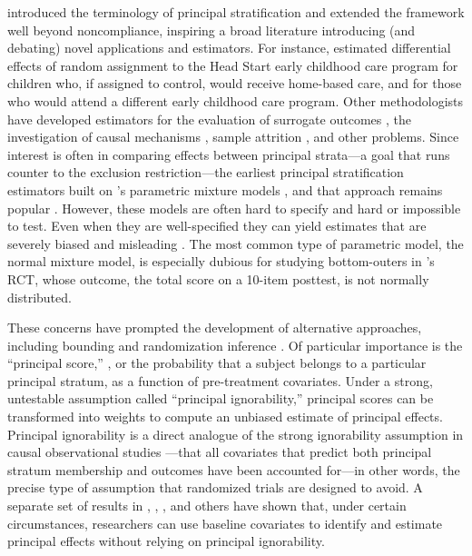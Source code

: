\documentclass[]{article}
\begin{document}
\citet{frangakis} introduced the terminology of principal stratification and extended the framework well beyond noncompliance, inspiring a broad literature introducing (and debating) novel applications and estimators.
For instance, \citet{fellerEtAl2016} estimated differential effects of random assignment to the Head Start early childhood care program for children who, if assigned to control, would receive home-based care, and for those who would attend a different early childhood care program.
Other methodologists have developed estimators for the evaluation of surrogate outcomes \citep{li2010bayesian}, the investigation of causal mechanisms \citep{lidsayPage}, sample attrition \citep{zhangRubin, ding2011}, and other problems.
Since interest is often in comparing effects between principal strata---a goal that runs counter to the exclusion restriction---the earliest principal stratification estimators built on \citet{imbens1997bayesian}'s parametric mixture models \citep[e.g.][]{Barnard01062003,mealli2004analyzing}, and that approach remains popular \citep{lidsayPage,fellerEtAl2016}.
However, these models are often hard to specify and hard or impossible to test.
Even when they are well-specified they can yield estimates that are severely biased and misleading \citep{griffin2008application,feller2016principal}.
The most common type of parametric model, the normal mixture model, is especially dubious for studying bottom-outers in \citet{impactPaper}'s RCT, whose outcome, the total score on a 10-item posttest, is not normally distributed.

These concerns have prompted the development of alternative approaches, including bounding \citep{bounding} and randomization inference \citep{nolen2011randomization}.
Of particular importance is the ``principal score,'' \citep{jo,dingLu,feller2017principal}, or the probability that a subject belongs to a particular principal stratum, as a function of pre-treatment covariates.
Under a strong, untestable assumption called ``principal ignorability,''  principal scores can be transformed into weights to compute an unbiased estimate of principal effects.
Principal ignorability is a direct analogue of the strong ignorability assumption in causal observational studies \citep[e.g.][]{rosenbaum1983central}---that all covariates that predict both principal stratum membership and outcomes have been accounted for---in other words, the precise type of assumption that randomized trials are designed to avoid.
A separate set of results in \citet{jo2002}, \citet{ding2011}, \citet{jiangDing2021}, and others have shown that, under certain circumstances, researchers can use baseline covariates to identify and estimate principal effects without relying on principal ignorability.
\end{document}
